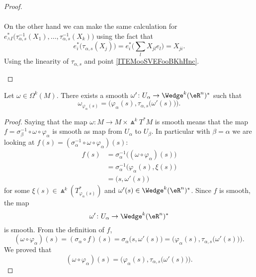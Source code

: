 \begin{proof}
\begin{subproof}
\begin{subequations}
\begin{align}
			\end{align}
		\end{subequations}
		On the other hand we can make the same calculation for \( e^*_{\wedge I}\big( \tau^{-1}_{\alpha,s}(X_1),\ldots,\tau_{\alpha,s}^{-1}(X_k) \big)\) using the fact that
		\begin{equation}
			e^*_i\big( \tau_{\alpha,s}(X_j) \big)=e^*_i\big( \sum_lX_{jl}e_l \big)=X_{ji}.
		\end{equation}
		Using the linearity of \( \tau_{\alpha,s}\) and point \ref{ITEMooSVEFooBKhHnc}.
	\end{subproof}
\end{proof}

\begin{lemma}		\label{LEMooOLSHooZNRoZs}
	Let \( \omega\in \Omega^k(M)\). There exists a smooth \(\omega' \colon U_{\alpha}\to \Wedge^k(\eR^n)^*  \) such that
	\begin{equation}
		\omega_{\varphi_{\alpha}(s)}=\Big( \varphi_{\alpha}(s),\tau_{\alpha,s}\big( \omega'(s) \big) \Big).
	\end{equation}
\end{lemma}

\begin{proof}
	Saying that the map \(\omega \colon M\to M\times \Wedge^kT^*M  \) is smooth means that the map \( f=\sigma_{\beta}^{-1}\circ \omega\circ\varphi_{\alpha}\) is smooth as map from \( U_{\alpha}\) to \( U_{\beta}\). In particular with \( \beta=\alpha\) we are looking at \( f(s)=(\sigma_{\alpha}^{-1}\circ \omega\circ \varphi_{\alpha})(s)\):
	\begin{subequations}
		\begin{align}
			f(s) & = \sigma_{\alpha}^{-1}\big( (\omega\circ \varphi_{\alpha})(s) \big) \\
			     & = \sigma_{\alpha}^{-1}\big( \varphi_{\alpha}(s),\xi(s) \big)        \\
			     & = \big( s,\omega'(s) \big)
		\end{align}
	\end{subequations}
	for some \( \xi(s)\in \Wedge^k(T^*_{\varphi_{\alpha}(s)})\) and \( \omega'(s)\in \Wedge^k(\eR^n)^*\). Since \( f\) is smooth, the map
	\begin{equation}
		\omega' \colon U_{\alpha}\to \Wedge^k(\eR^n)^*
	\end{equation}
	is smooth. From the definition of \( f\),
	\begin{equation}
		(\omega\circ \varphi_{\alpha})(s)=(\sigma_{\alpha}\circ f)(s)=\sigma_{\alpha}\big( s,\omega'(s) \big)=\Big( \varphi_{\alpha}(s),\tau_{\alpha,s}\big( \omega'(s) \big) \Big).
	\end{equation}
	We proved that
	\begin{equation}		\label{EQooMAINooBKsaex}
		(\omega\circ \varphi_{\alpha})(s)=\Big( \varphi_{\alpha}(s),\tau_{\alpha,s}\big( \omega'(s) \big) \Big).
	\end{equation}
\end{proof}

